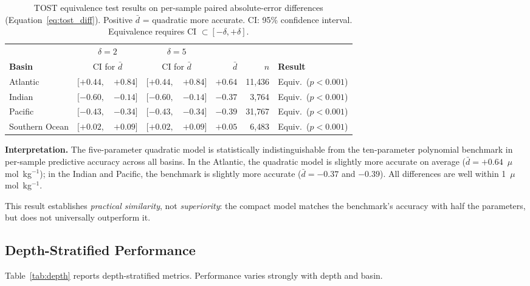 \documentclass[12pt,a4paper]{article}
\begin{document}
\begin{table}[htbp]
\centering
\caption{TOST equivalence test results on per-sample paired absolute-error differences (Equation~\ref{eq:tost_diff}). Positive $\bar{d}$ = quadratic more accurate. CI: 95\% confidence interval. Equivalence requires CI $\subset [-\delta, +\delta]$.}
\label{tab:tost}
\begin{tabular}{lr@{}l r@{}l rr l}
\toprule
 & \multicolumn{2}{c}{$\delta = 2$} & \multicolumn{2}{c}{$\delta = 5$} & & & \\
\cmidrule(lr){2-3} \cmidrule(lr){4-5}
\textbf{Basin} & \multicolumn{2}{c}{CI for $\bar{d}$} & \multicolumn{2}{c}{CI for $\bar{d}$} & $\bar{d}$ & $n$ & \textbf{Result} \\
\midrule
Atlantic        & $[+0.44,$ & $+0.84]$ & $[+0.44,$ & $+0.84]$ & $+0.64$ & 11{,}436 & Equiv.\ ($p < 0.001$) \\
Indian          & $[-0.60,$ & $-0.14]$ & $[-0.60,$ & $-0.14]$ & $-0.37$ &  3{,}764 & Equiv.\ ($p < 0.001$) \\
Pacific         & $[-0.43,$ & $-0.34]$ & $[-0.43,$ & $-0.34]$ & $-0.39$ & 31{,}767 & Equiv.\ ($p < 0.001$) \\
Southern Ocean  & $[+0.02,$ & $+0.09]$ & $[+0.02,$ & $+0.09]$ & $+0.05$ &  6{,}483 & Equiv.\ ($p < 0.001$) \\
\bottomrule
\end{tabular}
\end{table}

\textbf{Interpretation.} The five-parameter quadratic model is statistically indistinguishable from the ten-parameter polynomial benchmark in per-sample predictive accuracy across all basins. In the Atlantic, the quadratic model is slightly more accurate on average ($\bar{d} = +0.64$~$\mu$mol~kg$^{-1}$); in the Indian and Pacific, the benchmark is slightly more accurate ($\bar{d} = -0.37$ and $-0.39$). All differences are well within 1~$\mu$mol~kg$^{-1}$.

This result establishes \emph{practical similarity}, not \emph{superiority}: the compact model matches the benchmark's accuracy with half the parameters, but does not universally outperform it.

\subsection{Depth-Stratified Performance}

Table~\ref{tab:depth} reports depth-stratified metrics. Performance varies strongly with depth and basin.
\end{document}
